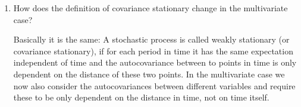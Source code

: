 \begin{enumerate}
\begin{solution}
\begin{align*}
\begin{pmatrix}
                                      \vdots                                              & \ddots & \vdots                                               \\
                                      (y_{K,t}- E[y_{K,t}])(y_{1,{t-h}} - E[y_{1,{t-h}}]) & \dots  & (y_{K,t} - E[y_{K,t}])(y_{K,{t-h}} - E[y_{K,{t-h}}])
                                  \end{pmatrix} \right]                                           \\
                   & = \begin{pmatrix}
                           E[(y_{1,t}- E[y_{1,t}])(y_{1,{t-h}} - E[y_{1,{t-h}}])] & \dots  & E[(y_{1,t} - E[y_{1,t}])(y_{K,{t-h}} - E[y_{K,{t-h}}])] \\
                           \vdots                                                 & \ddots & \vdots                                                  \\
                           E[(y_{K,t}- E[y_{K,t}])(y_{1,{t-h}} - E[y_{1,{t-h}}])] & \dots  & E[(y_{K,t} - E[y_{K,t}])(y_{K,{t-h}} - E[y_{K,{t-h}}])]
                       \end{pmatrix}                                        \\
                   & =\begin{pmatrix}
                          Cov(y_{1,t},y_{1,{t-h}}) & \dots  & Cov(y_{1,t},y_{K,{t-h}}) \\
                          \vdots                   & \ddots & \vdots                   \\
                          Cov(y_{K,t},y_{1,{t-h}}) & \dots  & Cov(y_{K,t},y_{K,{t-h}})
                      \end{pmatrix}
              \end{align*}
              On the diagonals we have the autocovariance of each variable, on the off-diagonals we have the covariances between the different variables.
          \end{solution}
    \item How does the definition of covariance stationary change in the multivariate case?
          \begin{solution}
              Basically it is the same: A stochastic process is called weakly stationary (or covariance stationary), if for each period in time it has the same expectation independent of time and the autocovariance between to points in time is only dependent on the distance of these two points. In the multivariate case we now also consider the autocovariances between different variables and require these to be only dependent on the distance in time, not on time itself.\\

\end{solution}
\end{enumerate}
